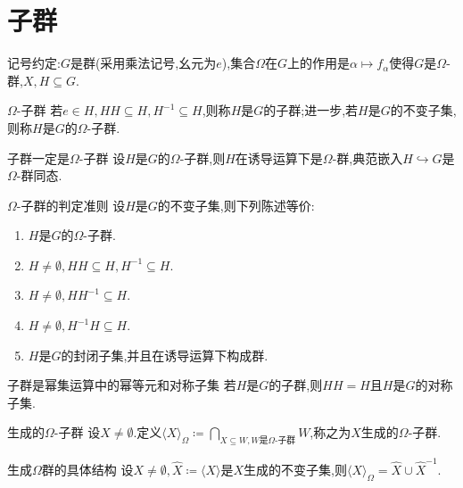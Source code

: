 \section{子群}

记号约定:$G$是群(采用乘法记号,幺元为$e$),集合$\Omega$在$G$上的作用是$\alpha\mapsto f_{\alpha}$使得$G$是$\Omega$-群,$X,H\subseteq G$.

\begin{definition}{$\Omega$-子群}{}
	若$e\in H,HH\subseteq H,H^{-1}\subseteq H$,则称$H$是$G$的子群;进一步,若$H$是$G$的不变子集,则称$H$是$G$的$\Omega$-子群.
\end{definition}

\begin{proposition}{子群一定是$\Omega$-子群}{}
	设$H$是$G$的$\Omega$-子群,则$H$在诱导运算下是$\Omega$-群,典范嵌入$H\hookrightarrow G$是$\Omega$-群同态.
\end{proposition}

\begin{proposition}{$\Omega$-子群的判定准则}{}
	设$H$是$G$的不变子集,则下列陈述等价:
	\begin{enumerate}
		\item $H$是$G$的$\Omega$-子群.
		\item $H\neq\emptyset,HH\subseteq H,H^{-1}\subseteq H$.
		\item $H\neq\emptyset,HH^{-1}\subseteq H$.
		\item $H\neq\emptyset,H^{-1}H\subseteq H$.
		\item $H$是$G$的封闭子集,并且在诱导运算下构成群.
	\end{enumerate}
\end{proposition}

\begin{proposition}{子群是幂集运算中的幂等元和对称子集}{}
	若$H$是$G$的子群,则$HH=H$且$H$是$G$的对称子集.
\end{proposition}

\begin{definition}{生成的$\Omega$-子群}{}
	设$X\neq\emptyset$.定义$\langle X\rangle_{\Omega}\coloneq\bigcap\limits_{X\subseteq W,W\text{是}\Omega\text{-子群}}W$,称之为$X$生成的$\Omega$-子群.
\end{definition}

\begin{proposition}{生成$\Omega$群的具体结构}{}
	设$X\neq\emptyset,\hat{X}\coloneq\langle X\rangle$是$X$生成的不变子集,则$\langle X\rangle_{\Omega}=\hat{X}\cup\hat{X}^{-1}$.
\end{proposition}

